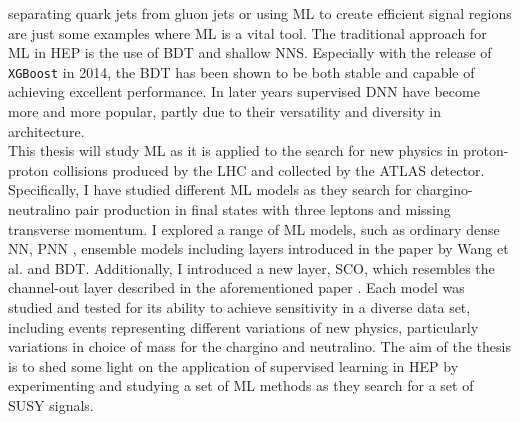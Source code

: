 separating quark jets from gluon jets \cite{PhysRevD.44.2025} or using \ac{ML} to create efficient signal regions \cite{baldi_searching_2014} are 
just some examples where \ac{ML} is a vital tool. The traditional approach for \ac{ML} in \ac{HEP} is the use of \acf{BDT} and shallow \acf{NNS}. 
Especially with the release of \verb!XGBoost! \cite{XGB} in 2014, the \ac{BDT} has been shown to be both stable and capable of achieving excellent 
performance. In later years supervised \acf{DNN} have become more and more popular, partly due to their versatility and diversity in architecture.
\newline
\\
This thesis will study \ac{ML} as it is applied to the search for new physics in proton-proton collisions produced by the \ac{LHC} and collected by 
the \acs{ATLAS} detector. Specifically, I have studied different \ac{ML} models as they search for chargino-neutralino pair production in final states 
with three leptons and missing transverse momentum. I explored a range of \ac{ML} models, such as ordinary dense \acs{NN}, \acf{PNN} \cite{PNN},
ensemble models including layers introduced in the paper by Wang et al. \cite{wang_maxout_2013} and \acl{BDT}. Additionally, I introduced a new layer, \acl{SCO}, which 
resembles the channel-out layer described in the aforementioned paper \cite{wang_maxout_2013}. Each model was studied and tested for its ability to achieve sensitivity
in a diverse data set, including events representing different variations of new physics, particularly variations in choice of mass for the chargino and neutralino.
The aim of the thesis is to shed some light on the application of supervised learning in \ac{HEP} by experimenting and studying a set of \ac{ML} methods as they search for 
a set of \ac{SUSY} signals.
\newpage
